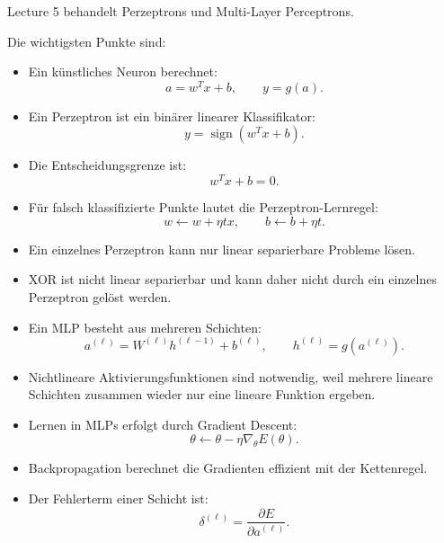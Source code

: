 \documentclass[11pt,a4paper]{scrartcl}
\begin{document}
\begin{answerbox}
    Lecture 5 behandelt Perzeptrons und Multi-Layer Perceptrons.

    Die wichtigsten Punkte sind:

    \begin{itemize}
        \item Ein künstliches Neuron berechnet:
        \[
            a = w^Tx+b,
            \qquad
            y=g(a).
        \]

        \item Ein Perzeptron ist ein binärer linearer Klassifikator:
        \[
            y
            =
            \operatorname{sign}(w^Tx+b).
        \]

        \item Die Entscheidungsgrenze ist:
        \[
            w^Tx+b=0.
        \]

        \item Für falsch klassifizierte Punkte lautet die Perzeptron-Lernregel:
        \[
            w \leftarrow w+\eta tx,
            \qquad
            b \leftarrow b+\eta t.
        \]

        \item Ein einzelnes Perzeptron kann nur linear separierbare Probleme
        lösen.

        \item XOR ist nicht linear separierbar und kann daher nicht durch ein
        einzelnes Perzeptron gelöst werden.

        \item Ein MLP besteht aus mehreren Schichten:
        \[
            a^{(\ell)}
            =
            W^{(\ell)}h^{(\ell-1)}+b^{(\ell)},
            \qquad
            h^{(\ell)}
            =
            g(a^{(\ell)}).
        \]

        \item Nichtlineare Aktivierungsfunktionen sind notwendig, weil mehrere
        lineare Schichten zusammen wieder nur eine lineare Funktion ergeben.

        \item Lernen in MLPs erfolgt durch Gradient Descent:
        \[
            \theta
            \leftarrow
            \theta
            -
            \eta\nabla_\theta E(\theta).
        \]

        \item Backpropagation berechnet die Gradienten effizient mit der
        Kettenregel.

        \item Der Fehlerterm einer Schicht ist:
        \[
            \delta^{(\ell)}
            =
            \frac{\partial E}{\partial a^{(\ell)}}.
        \]


\end{itemize}
\end{answerbox}
\end{document}

